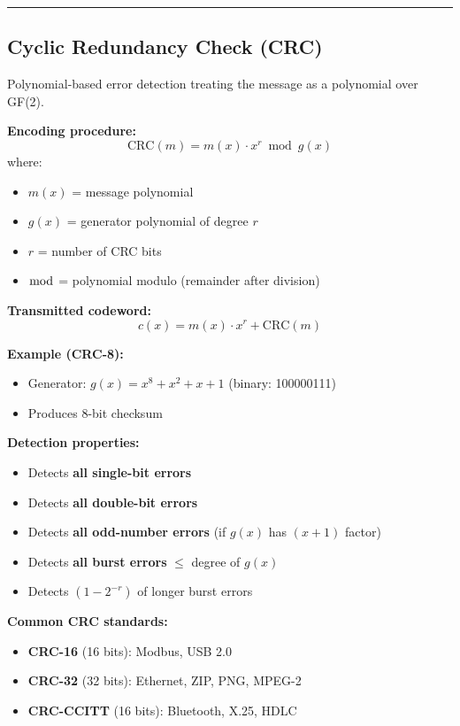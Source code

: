 \begin{center}\rule{0.5\linewidth}{0.5pt}\end{center}

\subsection{Cyclic Redundancy Check (CRC)}

Polynomial-based error detection treating the message as a polynomial over GF(2).

\textbf{Encoding procedure:}
\begin{equation}
\text{CRC}(m) = m(x) \cdot x^r \bmod g(x)
\label{eq:crc-encoding}
\end{equation}
where:
\begin{itemize}
\item $m(x)$ = message polynomial
\item $g(x)$ = generator polynomial of degree $r$
\item $r$ = number of CRC bits
\item $\bmod$ = polynomial modulo (remainder after division)
\end{itemize}

\textbf{Transmitted codeword:}
\begin{equation}
c(x) = m(x) \cdot x^r + \text{CRC}(m)
\label{eq:crc-codeword}
\end{equation}

\textbf{Example (CRC-8):}
\begin{itemize}
\item Generator: $g(x) = x^8 + x^2 + x + 1$ (binary: 100000111)
\item Produces 8-bit checksum
\end{itemize}

\textbf{Detection properties:}
\begin{itemize}
\item Detects \textbf{all single-bit errors}
\item Detects \textbf{all double-bit errors}
\item Detects \textbf{all odd-number errors} (if $g(x)$ has $(x+1)$ factor)
\item Detects \textbf{all burst errors} $\leq$ degree of $g(x)$
\item Detects $(1 - 2^{-r})$ of longer burst errors
\end{itemize}

\textbf{Common CRC standards:}
\begin{itemize}
\item \textbf{CRC-16} (16 bits): Modbus, USB 2.0
\item \textbf{CRC-32} (32 bits): Ethernet, ZIP, PNG, MPEG-2
\item \textbf{CRC-CCITT} (16 bits): Bluetooth, X.25, HDLC
\end{itemize}

